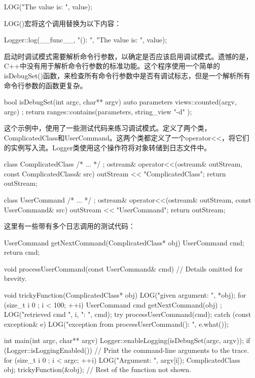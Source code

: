 \begin{cpp}
LOG("The value is: ", value);
\end{cpp}

LOG()宏将这个调用替换为以下内容：

\begin{cpp}
Logger::log(__func__, "(): ", "The value is: ", value);
\end{cpp}

启动时调试模式需要解析命令行参数，以确定是否应该启用调试模式。遗憾的是，C++中没有用于解析命令行参数的标准功能。这个程序使用一个简单的isDebugSet()函数，来检查所有命令行参数中是否有调试标志，但是一个解析所有命令行参数的函数更复杂。

\begin{cpp}
bool isDebugSet(int argc, char** argv)
{
    auto parameters { views::counted(argv, argc) };
    return ranges::contains(parameters, string_view { "-d" });
}
\end{cpp}

这个示例中，使用了一些测试代码来练习调试模式。定义了两个类，ComplicatedClass和UserCommand。这两个类都定义了一个operator<{}<，将它们的实例写入流。Logger类使用这个操作符将对象转储到日志文件中。

\begin{cpp}
class ComplicatedClass { /* ... */ };
ostream& operator<<(ostream& outStream, const ComplicatedClass& src)
{
    outStream << "ComplicatedClass";
    return outStream;
}

class UserCommand { /* ... */ };
ostream& operator<<(ostream& outStream, const UserCommand& src)
{
    outStream << "UserCommand";
    return outStream;
}
\end{cpp}

这里有一些带有多个日志调用的测试代码：

\begin{cpp}
UserCommand getNextCommand(ComplicatedClass* obj)
{
    UserCommand cmd;
    return cmd;
}

void processUserCommand(const UserCommand& cmd)
{
    // Details omitted for brevity.
}

void trickyFunction(ComplicatedClass* obj)
{
    LOG("given argument: ", *obj);
    for (size_t i { 0 }; i < 100; ++i) {
        UserCommand cmd { getNextCommand(obj) };
        LOG("retrieved cmd ", i, ": ", cmd);
        try {
            processUserCommand(cmd);
        } catch (const exception& e) {
            LOG("exception from processUserCommand(): ", e.what());
        }
    }
}

int main(int argc, char** argv)
{
    Logger::enableLogging(isDebugSet(argc, argv));
    if (Logger::isLoggingEnabled()) {
        // Print the command-line arguments to the trace.
        for (size_t i { 0 }; i < argc; ++i) {
            LOG("Argument: ", argv[i]);
        }
    }
    ComplicatedClass obj;
    trickyFunction(&obj);
    // Rest of the function not shown.
}
\end{cpp}

